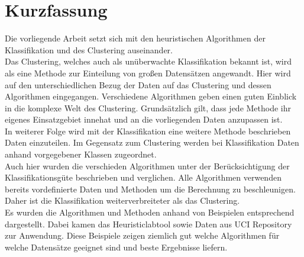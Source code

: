 \chapter{Kurzfassung}
Die vorliegende Arbeit setzt sich mit den heuristischen Algorithmen der Klassifikation und  des Clustering auseinander. \\ Das Clustering, welches auch als unüberwachte Klassifikation bekannt ist, wird als eine Methode zur Einteilung von großen Datensätzen angewandt. Hier wird auf den unterschiedlichen Bezug der Daten  auf das Clustering und dessen Algorithmen eingegangen. Verschiedene Algorithmen geben einen guten Einblick in die komplexe Welt des Clustering. Grundsätzlich gilt, dass jede Methode ihr eigenes Einsatzgebiet innehat und an die vorliegenden Daten anzupassen ist.\\ 
In weiterer Folge wird mit der Klassifikation eine weitere Methode beschrieben Daten einzuteilen. Im Gegensatz zum Clustering werden bei Klassifikation Daten anhand vorgegebener Klassen zugeordnet. \\
Auch hier wurden die verschieden Algorithmen unter der Berücksichtigung der Klassifikationsgüte beschrieben und verglichen. Alle Algorithmen verwenden bereits vordefinierte Daten und Methoden um die Berechnung zu beschleunigen. Daher ist die Klassifikation weiterverbreiteter als das Clustering. \\ Es wurden die Algorithmen und Methoden anhand von  Beispielen  entsprechend dargestellt. Dabei kamen das Heuristiclabtool sowie Daten aus UCI Repository zur Anwendung. Diese Beispiele zeigen ziemlich gut welche Algorithmen für welche Datensätze geeignet sind und beste Ergebnisse liefern.
